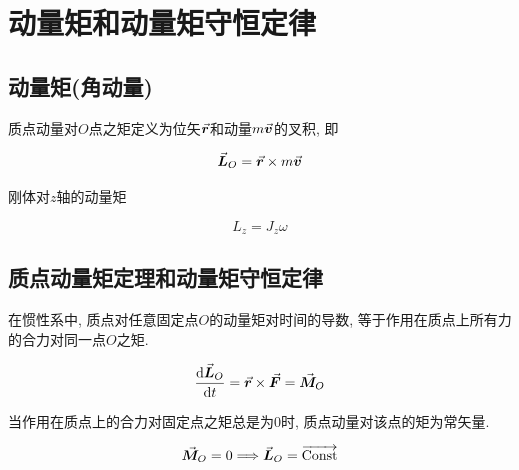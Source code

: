 \newpage

\section{动量矩和动量矩守恒定律} \label{5.4}

\subsection{动量矩(角动量)}

\begin{definition} \label{C5-df3}
	
	质点动量对$O$点之矩定义为位矢$\va*{r}$和动量$m\va*{v}$的叉积, 即
	
	\begin{equation}
		\va*{L}_O = \va*{r} \times m \va*{v} \label{C5-eq16}
	\end{equation}
	
	刚体对$z$轴的动量矩
	
	\begin{equation}
		L_z = J_z \omega \label{C5-eq17}
	\end{equation}
	
\end{definition}

\subsection{质点动量矩定理和动量矩守恒定律}

\begin{theorem}[质点动量矩定理] \label{C5-th3}
	在惯性系中, 质点对任意固定点$O$的动量矩对时间的导数, 等于作用在质点上所有力的合力对同一点$O$之矩. 
	
	\begin{equation}
		\dv{\va*{L}_O}{t} = \va*{r} \times \va*{F} = \va*{M}_O \label{C5-eq18}
	\end{equation}

\end{theorem}

\begin{axiom}[质点动量矩守恒定律] \label{C5-ax1}
	
	当作用在质点上的合力对固定点之矩总是为0时, 质点动量对该点的矩为常矢量. 
	
	\begin{equation}
		\va*{M}_O = 0 \Longrightarrow \va*{L}_O = \overrightarrow{\text{Const}} \label{C5-eq19}
	\end{equation}
		
\end{axiom}

